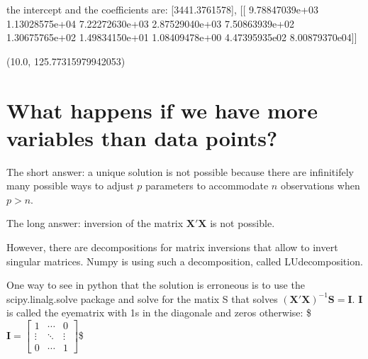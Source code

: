 \documentclass[letterpaper,10pt,english]{jupyterBook}
\begin{document}
\begin{sphinxVerbatim}[commandchars=\\\{\}]
the intercept and the coefficients are: [\PYGZhy{}3441.3761578], [[ 9.78847039e+03 \PYGZhy{}1.13028575e+04  7.22272630e+03 \PYGZhy{}2.87529040e+03
   7.50863939e+02 \PYGZhy{}1.30675765e+02  1.49834150e+01 \PYGZhy{}1.08409478e+00
   4.47395935e\PYGZhy{}02 \PYGZhy{}8.00879370e\PYGZhy{}04]]
\end{sphinxVerbatim}

\begin{sphinxVerbatim}[commandchars=\\\{\}]
(\PYGZhy{}10.0, 125.77315979942053)
\end{sphinxVerbatim}

\noindent{}


\chapter{What happens if we have more variables than data points?}
\label{\detokenize{Regression_Techniques:what-happens-if-we-have-more-variables-than-data-points}}
\sphinxAtStartPar
The short answer: a unique solution is not possible because there are infinitifely many possible ways to adjust \(p\) parameters to accommodate \(n\) observations when \(p > n\).

\sphinxAtStartPar
The long answer: inversion of the matrix \(\mathbf{X}'\mathbf{X}\) is not possible.

\sphinxAtStartPar
However, there are decompositions for matrix inversions that allow to invert singular matrices. Numpy is using such a decomposition, called LU\sphinxhyphen{}decomposition.

\sphinxAtStartPar
One way to see in python that the solution is erroneous is to use the scipy.linalg.solve package and solve for the matix S that solves \((\mathbf{X}'\mathbf{X})^{-1} \mathbf{S} = \mathbf{I}\). \(\mathbf{I}\) is called the eye\sphinxhyphen{}matrix with 1s in the diagonale and zeros otherwise:
\$\(
\mathbf{I}=\left[
\begin{array}{ccc}
   1 & \cdots & 0 \\
   \vdots & \ddots & \vdots \\
   0 & \cdots & 1
\end{array}
\right]
\)\$
\end{document}
